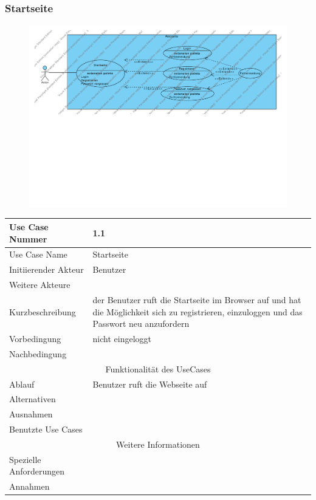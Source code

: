 \documentclass[10pt,a4paper]{article}
\begin{document}
	\subsubsection{Startseite}
	\begin{figure}[h]
		\includegraphics[width=\linewidth]{gfx/webseite/startseite.pdf}
	\end{figure}
	\begin{tabular}{|l|p{.5\linewidth}|}
	\hline Use Case Nummer & 1.1 \\ 
	\hline Use Case Name & Startseite \\ 
	\hline Initiierender Akteur & Benutzer \\
	\hline Weitere Akteure &  \\
	\hline Kurzbeschreibung & der Benutzer ruft die Startseite im Browser auf und hat die M\"oglichkeit sich zu registrieren, einzuloggen und das Passwort neu anzufordern \\
	\hline Vorbedingung & nicht eingeloggt \\
	\hline Nachbedingung &  \\
	\hline \multicolumn{2}{|c|}{Funktionalität des UseCases}\\
	\hline Ablauf & Benutzer ruft die Webseite auf \\
	\hline Alternativen &  \\
	\hline Ausnahmen &  \\
	\hline Benutzte Use Cases &  \\
	\hline \multicolumn{2}{|c|}{Weitere Informationen} \\
	\hline Spezielle Anforderungen &  \\
	\hline Annahmen &  \\
	\hline
	\end{tabular} 
\end{document}
